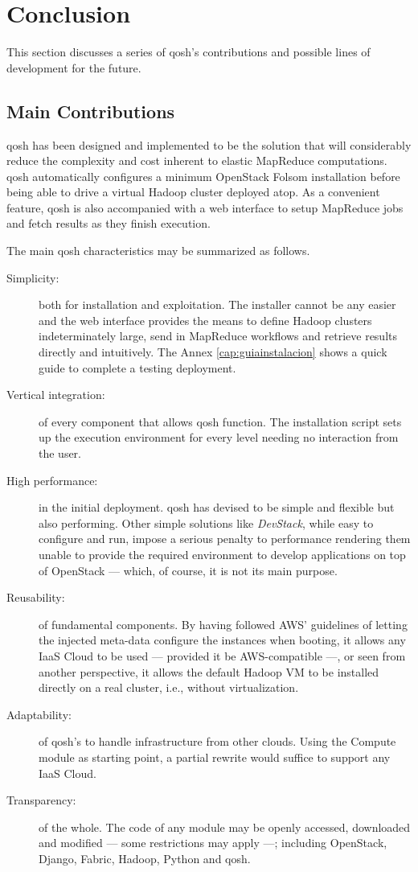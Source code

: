\chapter*{Conclusion}\label{cap:aportaciones}
\noindent This section discusses a series of qosh's contributions and possible lines of development for the future.

\section*{Main Contributions}\label{sec:bondadesdeficiencias}
\noindent qosh has been designed and implemented to be the solution that will considerably reduce the complexity and cost inherent to elastic MapReduce computations. qosh automatically configures a minimum OpenStack Folsom installation before being able to drive a virtual Hadoop cluster deployed atop. As a convenient feature, qosh is also accompanied with a web interface to setup MapReduce jobs and fetch results as they finish execution.

The main qosh characteristics may be summarized as follows.

\begin{description}
    \item[Simplicity:] both for installation and exploitation. The installer cannot be any easier and the web interface provides the means to define Hadoop clusters indeterminately large, send in MapReduce workflows and retrieve results directly and intuitively. The Annex \ref{cap:guiainstalacion} shows a quick guide to complete a testing deployment.
    \item[Vertical integration:] of every component that allows qosh function. The installation script sets up the execution environment for every level needing no interaction from the user.
    \item[High performance:] in the initial deployment. qosh has devised to be simple and flexible but also performing. Other simple solutions like \emph{DevStack}, while easy to configure and run, impose a serious penalty to performance rendering them unable to provide the required environment to develop applications on top of OpenStack --- which, of course, it is not its main purpose.
    \item[Reusability:] of fundamental components. By having followed AWS' guidelines of letting the injected meta-data configure the instances when booting, it allows any IaaS Cloud to be used --- provided it be AWS-compatible ---, or seen from another perspective, it allows the default Hadoop VM to be installed directly on a real cluster, i.e., without virtualization.
    \item[Adaptability:] of qosh's to handle infrastructure from other clouds. Using the Compute module as starting point, a partial rewrite would suffice to support any IaaS Cloud.
    \item[Transparency:] of the whole. The code of any module may be openly accessed, downloaded and modified --- some restrictions may apply ---; including OpenStack, Django, Fabric, Hadoop, Python and qosh.
\end{description}


